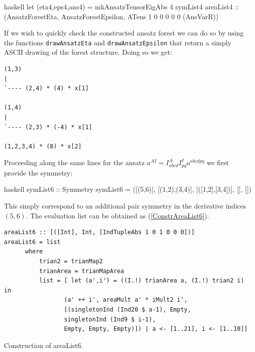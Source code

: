 \documentclass[a4paper,12pt, DIV=14, BCOR=5mm, twoside, headsepline, numbers=noenddot]{scrbook}
\begin{document}
\begin{center}
\begin{cminted}{haskell}
let (eta4,eps4,ans4) = mkAnsatzTensorEigAbs 4 symList4 areaList4 :: 
                         (AnsatzForestEta, AnsatzForestEpsilon,
                         ATens 1 0 0 0 0 0 (AnsVarR))
\end{cminted}
\end{center}

If we wish to quickly check the constructed ansatz forest we can do so by using the functions \texttt{drawAnsatzEta} and \texttt{drawAnsatzEpsilon} that return a simply ASCII drawing of the forest structure. Doing so we get:

\begin{center}
\begin{BVerbatim}
(1,3)
|
`---- (2,4) * (4) * x[1]

(1,4)
|
`---- (2,3) * (-4) * x[1]

(1,2,3,4) * (8) * x[2]
\end{BVerbatim}
\end{center}

Proceeding along the same lines for the ansatz $a^{AI} = I^A _{abcd} I^I_{pq} a^{abcdpq}$ we first provide the symmetry:

\begin{center}
\begin{cminted}{haskell}
symList6 :: Symmetry
symList6 = ([(5,6)], [(1,2),(3,4)], [([1,2],[3,4])], [], [])
\end{cminted}
\end{center}

This simply correspond to an additional pair symmetry in the derivative indices $(5,6)$. The evaluation list can be obtained as (\ref{ConstrAreaList6}).

\begin{listing}[hbt!]
\begin{verbatim}
areaList6 :: [([Int], Int, [IndTupleAbs 1 0 1 0 0 0])]
areaList6 = list
      where
          trian2 = trianMap2
          trianArea = trianMapArea
          list = [ let (a',i') = ((I.!) trianArea a, (I.!) trian2 i) in
                 (a' ++ i', areaMult a' * iMult2 i', 
                 [(singletonInd (Ind20 $ a-1), Empty,
                 singletonInd (Ind9 $ i-1),
                 Empty, Empty, Empty)]) | a <- [1..21], i <- [1..10]]
\end{verbatim} 
\caption{Construction of areaList6.}\label{ConstrAreaList6}
\end{listing}
\end{document}
